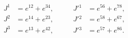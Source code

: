 \begin{equation}
\begin{aligned}
   J^1 &= e^{12} + e^{34} , & \qquad 
   J'{}^1 &= e^{56} + e^{78} , \\
   J^2 &= e^{14} + e^{23} , & \qquad
   J'{}^2 &= e^{58} + e^{67} , \\
   J^3 &= e^{13} + e^{42} , & \qquad
   J'{}^3 &= e^{57} + e^{86} .
\end{aligned} 
\end{equation}

